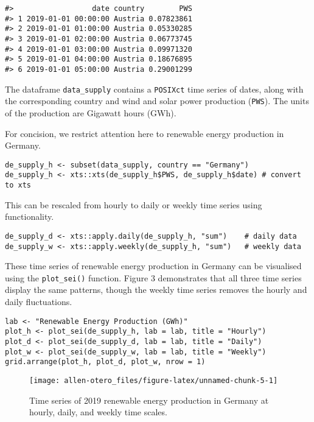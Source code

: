 \begin{verbatim}
#>                  date country        PWS
#> 1 2019-01-01 00:00:00 Austria 0.07823861
#> 2 2019-01-01 01:00:00 Austria 0.05330285
#> 3 2019-01-01 02:00:00 Austria 0.06773745
#> 4 2019-01-01 03:00:00 Austria 0.09971320
#> 5 2019-01-01 04:00:00 Austria 0.18676895
#> 6 2019-01-01 05:00:00 Austria 0.29001299
\end{verbatim}

The dataframe \texttt{data\_supply} contains a \texttt{POSIXct} time series of dates, along with the corresponding country and wind and solar power production (\texttt{PWS}). The units of the production are Gigawatt hours (GWh).

For concision, we restrict attention here to renewable energy production in Germany.

\begin{verbatim}
de_supply_h <- subset(data_supply, country == "Germany")
de_supply_h <- xts::xts(de_supply_h$PWS, de_supply_h$date) # convert to xts
\end{verbatim}

This can be rescaled from hourly to daily or weekly time series using  functionality.

\begin{verbatim}
de_supply_d <- xts::apply.daily(de_supply_h, "sum")    # daily data
de_supply_w <- xts::apply.weekly(de_supply_h, "sum")   # weekly data
\end{verbatim}

These time series of renewable energy production in Germany can be visualised using the \texttt{plot\_sei()} function. Figure 3 demonstrates that all three time series display the same patterns, though the weekly time series removes the hourly and daily fluctuations.

\begin{verbatim}
lab <- "Renewable Energy Production (GWh)"
plot_h <- plot_sei(de_supply_h, lab = lab, title = "Hourly")
plot_d <- plot_sei(de_supply_d, lab = lab, title = "Daily")
plot_w <- plot_sei(de_supply_w, lab = lab, title = "Weekly")
grid.arrange(plot_h, plot_d, plot_w, nrow = 1)
\end{verbatim}

\begin{figure}

{\centering \texttt{[image: allen-otero\_files/figure-latex/unnamed-chunk-5-1]} 

}

\caption{Time series of 2019 renewable energy production in Germany at hourly, daily, and weekly time scales.}\label{fig:unnamed-chunk-5}
\end{figure}


